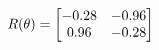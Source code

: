 \documentclass[preview]{standalone}
\begin{document}
\begin{align*}
\special{dvisvgm:raw <g id='unique000'>}R(\theta) = \begin{bmatrix}-0.28 & -0.96\\0.96 & -0.28\end{bmatrix}\special{dvisvgm:raw </g>}
\end{align*}
\end{document}
